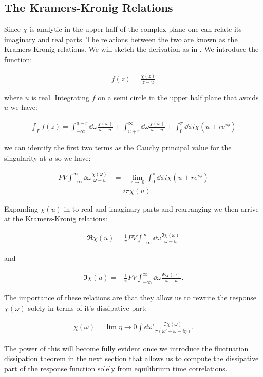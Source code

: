 \subsection{The Kramers-Kronig Relations}

Since $\chi$ is analytic in the upper half of the complex plane one can relate its imaginary and real parts. The relations between the two are known as the Kramers-Kronig relations. We will sketch the derivation as in \cite{Reichl1999}. We introduce the function:

\begin{align}
f(z) = \frac{\chi(z)}{z - u}
\end{align}

\noindent where $u$ is real. Integrating $f$ on a semi circle in the upper half plane that avoids $u$ we have:

\begin{align}
\int_{\Gamma} f(z) = \int_{- \infty}^{u-r} \dd \omega \frac{\chi(\omega)}{\omega - u} + \int_{u+r}^{\infty} \dd \omega \frac{\chi(\omega)}{\omega - u} + \int_{0}^{\pi} \dd \phi i \chi \left( u + re^{i\phi} \right)
\end{align}

\noindent we can identify the first two terms as the Cauchy principal value for the singularity at $u$ so we have:

\begin{align}
PV \int_{- \infty}^{\infty} \dd \omega \frac{\chi(\omega)}{\omega - u} &= - \lim_{r \to \ 0} \int_{0}^{\pi} \dd \phi i \chi \left( u + re^{i\phi} \right)\\
&= i \pi \chi(u).
\end{align}

Expanding $\chi(u)$ in to real and imaginary parts and rearranging we then arrive at the Kramers-Kronig relations:

\begin{align}
\Re{\chi(u)} = \frac{1}{\pi} PV \int_{- \infty}^{\infty} \dd \omega \frac{ \Im{\chi(\omega)} }{\omega - u} 
\end{align}

and

\begin{align}
\Im{\chi(u)} = - \frac{1}{\pi} PV \int_{- \infty}^{\infty} \dd \omega \frac{ \Re{\chi(\omega)} }{\omega - u}.
\end{align}

\noindent The importance of these relations are that they allow us to rewrite the response $\chi(\omega)$ solely in terms of it's dissipative part:

\begin{align}
\chi(\omega) = \lim{\eta \to 0} \int \dd \omega' \frac{\Im{\chi(\omega)}}{\pi\left(\omega' - \omega - i \eta \right)}.
\end{align}

\noindent The power of this will become fully evident once we introduce the fluctuation dissipation theorem in the next section that allows us to compute the dissipative part of the response function solely from equilibrium time correlations.
